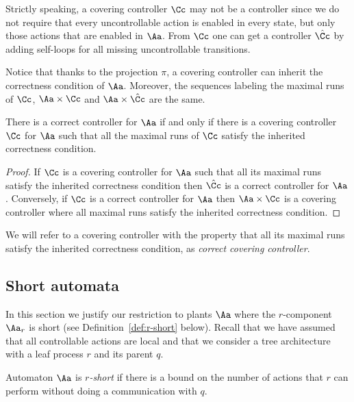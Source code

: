 \documentclass[10pt,a4paper]{article}
\begin{document}
\begin{remark} Strictly speaking, a covering controller $\Cc$ may not be a
controller since we  do not require that every uncontrollable action
is enabled in every state, but only those actions that are enabled
in $\Aa$. From $\Cc$ one can get a controller $\hat{\Cc}$ by adding
self-loops for all missing uncontrollable transitions. 

Notice that thanks to the projection $\pi$, a covering controller can
inherit the correctness condition of $\Aa$. Moreover, the sequences
labeling the maximal runs
of $\Cc$, $\Aa \times \Cc$ and $\Aa \times \hat{\Cc}$ are the same.
\end{remark}


\begin{lemma}\label{lemma:covering}
  There is a correct controller for $\Aa$ if and only if there is a
  covering controller $\Cc$ for $\Aa$ such that all the maximal runs
  of $\Cc$ satisfy the inherited correctness condition.
\end{lemma}

\begin{proof}
  If $\Cc$ is a covering
controller for $\Aa$ such that all its 
  maximal runs satisfy the inherited correctness condition then
  $\hat{\Cc}$ is a correct controller for $\Aa$. 
Conversely, if $\Cc$ is a correct controller for $\Aa$ then
  $\Aa\times\Cc$ is a covering controller where all maximal runs
  satisfy the inherited correctness condition.
\end{proof}

We will refer to a covering controller with the
property that  all its
maximal runs satisfy the inherited correctness condition, as 
\emph{correct covering controller}.

\subsection{Short automata}\label{sec:short}

In this section we justify our restriction to plants $\Aa$ where the
$r$-component $\Aa_r$ is short (see Definition~\ref{def:r-short}
below).  Recall that we have assumed that all controllable actions are
local and that we consider a tree architecture with a leaf process $r$
and its parent $q$.

\begin{definition}[$r$-short]\label{def:r-short}
 Automaton $\Aa$ is \emph{$r$-short} if there
  is a bound on the number of actions that $r$ can perform without
  doing a communication with $q$. 
\end{definition}
\end{document}
